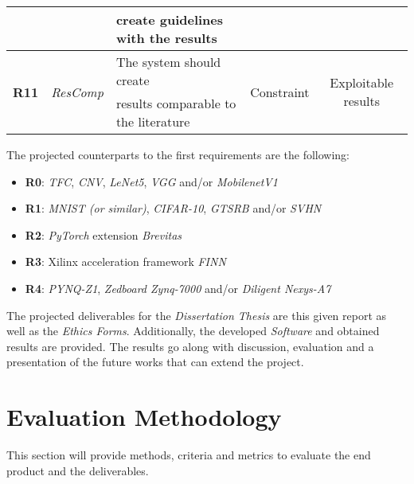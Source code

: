 {\begin{tabular}{| c c l c c |}
                              &                                         & create guidelines with the results                                     &                             & \\ \hline
\multirow{2}{*}{\textbf{R11}} & \multirow{2}{*}{\emph{ResComp}}         & The system should create                                               & \multirow{2}{*}{Constraint} & \multirow{2}{*}{Exploitable results}\\
                              &                                         & results comparable to the literature                                   &                             & \\ \hline
\end{tabular}
}

The projected counterparts to the first requirements are the following:
\begin{itemize}
  \item \textbf{R0}: \emph{TFC}, \emph{CNV}, \emph{LeNet5}, \emph{VGG} and/or \emph{MobilenetV1}
  \item \textbf{R1}: \emph{MNIST (or similar)}, \emph{CIFAR-10}, \emph{GTSRB} and/or \emph{SVHN}
  \item \textbf{R2}: \emph{PyTorch} extension \emph{Brevitas}
  \item \textbf{R3}: Xilinx acceleration framework \emph{FINN}
  \item \textbf{R4}: \emph{PYNQ-Z1}, \emph{Zedboard Zynq-7000} and/or \emph{Diligent Nexys-A7}
\end{itemize}

The projected deliverables for the \emph{Dissertation Thesis} are this given report as well as the \emph{Ethics Forms}. Additionally, the developed \emph{Software} and obtained results are provided. The results go along with discussion, evaluation and a presentation of the future works that can extend the project.


\section{Evaluation Methodology}

This section will provide methods, criteria and metrics to evaluate the end product and the deliverables.


